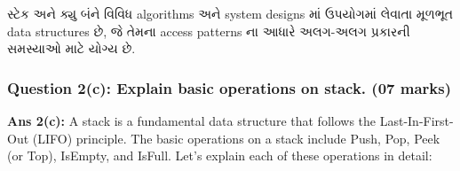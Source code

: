 સ્ટેક અને ક્યુ બંને વિવિધ algorithms અને system designs માં ઉપયોગમાં લેવાતા મૂળભૂત
data structures છે, જે તેમના access patterns ના આધારે અલગ-અલગ પ્રકારની સમસ્યાઓ
માટે યોગ્ય છે.

\hypertarget{question-2c-explain-basic-operations-on-stack.-07-marks}{%
\subsubsection{Question 2(c): Explain basic operations on stack. (07
marks)}\label{question-2c-explain-basic-operations-on-stack.-07-marks}}

\textbf{Ans 2(c):} A stack is a fundamental data structure that follows
the Last-In-First-Out (LIFO) principle. The basic operations on a stack
include Push, Pop, Peek (or Top), IsEmpty, and IsFull. Let's explain
each of these operations in detail:

